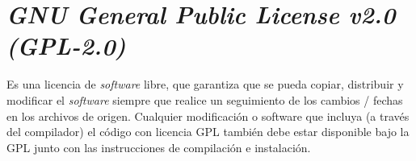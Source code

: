 \section{\textit{GNU General Public License v2.0 (GPL-2.0) }}

	Es una licencia de \textit{software} libre, que garantiza que se pueda copiar, distribuir y modificar el \textit{software} siempre que realice un seguimiento de los cambios / fechas en los archivos de origen. Cualquier modificaci\'on o software que incluya (a trav\'es del compilador) el c\'odigo con licencia GPL tambi\'en debe estar disponible bajo la GPL junto con las instrucciones de compilaci\'on e instalaci\'on.